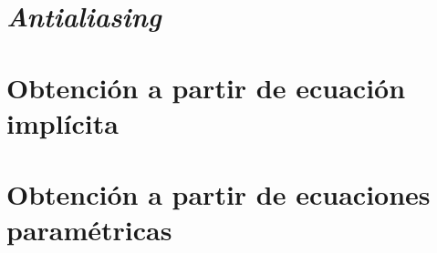 



\section{\textit{Antialiasing}}


\section{Obtención a partir de ecuación implícita}


\section{Obtención a partir de ecuaciones paramétricas}

